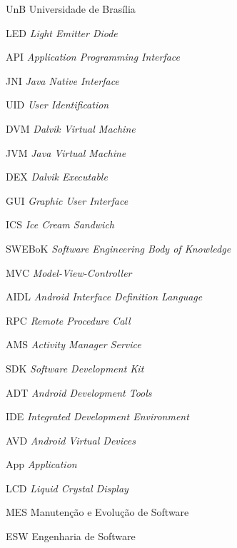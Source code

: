 \begin{siglas}
  \item[UnB] Universidade de Brasília
  \item[LED] \textit{Light Emitter Diode}
  \item[API] \textit{Application Programming Interface}
  \item[JNI] \textit{Java Native Interface}
  \item[UID] \textit{User Identification}
  \item[DVM] \textit{Dalvik Virtual Machine}
  \item[JVM] \textit{Java Virtual Machine}
  \item[DEX] \textit{Dalvik Executable}
  \item[GUI] \textit{Graphic User Interface}
  \item[ICS] \textit{Ice Cream Sandwich}
  \item[SWEBoK] \textit{Software Engineering Body of Knowledge}
  \item[MVC] \textit{Model-View-Controller}
  \item[AIDL] \textit{Android Interface Definition Language}
  \item[RPC] \textit{Remote Procedure Call}
  \item[AMS] \textit{Activity Manager Service}
  \item[SDK] \textit{Software Development Kit}
  \item[ADT] \textit{Android Development Tools}
  \item[IDE] \textit{Integrated Development Environment}
  \item[AVD] \textit{Android Virtual Devices} 
  \item[App] \textit{Application}
  \item[LCD] \textit{Liquid Crystal Display}
  \item[MES] Manutenção e Evolução de Software
  \item[ESW] Engenharia de Software

\end{siglas}

